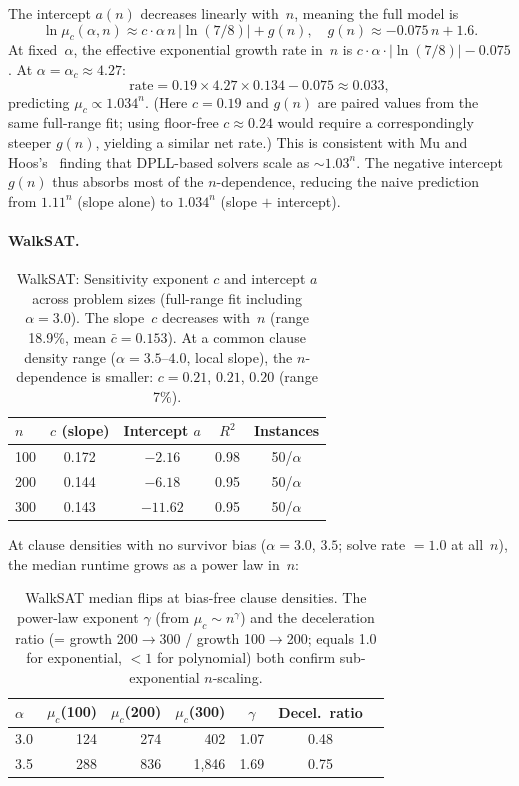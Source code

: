 \documentclass[11pt,a4paper]{article}
\newcommand{\mc}{\mu_c}
\begin{document}
The intercept $a(n)$ decreases linearly with~$n$, meaning
the full model is
\[
\ln \mc(\alpha, n) \approx c \cdot \alpha\, n\, |\!\ln(7/8)|
  + g(n), \quad g(n) \approx -0.075\, n + 1.6.
\]
At fixed~$\alpha$, the effective exponential growth rate in~$n$
is $c \cdot \alpha \cdot |\!\ln(7/8)| - 0.075$.
At $\alpha = \alpha_c \approx 4.27$:
\[
\text{rate} = 0.19 \times 4.27 \times 0.134 - 0.075
  \approx 0.033,
\]
predicting $\mc \propto 1.034^n$.
(Here $c = 0.19$ and $g(n)$ are paired values from the same
full-range fit; using floor-free $c \approx 0.24$ would require
a correspondingly steeper $g(n)$, yielding a similar net rate.)
This is consistent with Mu and Hoos's~\cite{MuHoos2015}
finding that DPLL-based solvers scale as $\sim\! 1.03^n$.
The negative intercept $g(n)$ thus absorbs most of the
$n$-dependence, reducing the naive prediction from
$1.11^n$ (slope alone) to $1.034^n$ (slope $+$ intercept).

\paragraph{WalkSAT.}

\begin{table}[h]
\centering
\begin{tabular}{lcccc}
\toprule
$n$ & $c$ (slope) & Intercept $a$ & $R^2$ & Instances \\
\midrule
100 & 0.172 & $-2.16$  & 0.98 & 50/$\alpha$ \\
200 & 0.144 & $-6.18$  & 0.95 & 50/$\alpha$ \\
300 & 0.143 & $-11.62$ & 0.95 & 50/$\alpha$ \\
\bottomrule
\end{tabular}
\caption{WalkSAT: Sensitivity exponent $c$ and intercept $a$
across problem sizes (full-range fit including $\alpha = 3.0$).
The slope~$c$ decreases with~$n$
(range 18.9\%, mean $\bar{c} = 0.153$).
At a common clause density range ($\alpha = 3.5$--$4.0$,
local slope), the $n$-dependence is smaller:
$c = 0.21$, $0.21$, $0.20$ (range 7\%).}
\label{tab:n_scaling_ws}
\end{table}

At clause densities with no survivor bias
($\alpha = 3.0$, $3.5$; solve rate $= 1.0$ at all~$n$),
the median runtime grows as a power law in~$n$:

\begin{table}[h]
\centering
\begin{tabular}{lrrrccc}
\toprule
$\alpha$ & $\mc$(100) & $\mc$(200) & $\mc$(300)
  & $\gamma$ & Decel.\ ratio \\
\midrule
3.0 & 124 & 274 & 402 & 1.07 & 0.48 \\
3.5 & 288 & 836 & 1{,}846 & 1.69 & 0.75 \\
\bottomrule
\end{tabular}
\caption{WalkSAT median flips at bias-free clause densities.
The power-law exponent $\gamma$ (from $\mc \sim n^\gamma$)
and the deceleration ratio
(= growth 200$\to$300 / growth 100$\to$200; equals 1.0 for
exponential, $< 1$ for polynomial) both confirm sub-exponential
$n$-scaling.}
\label{tab:n_scaling_ws_raw}
\end{table}
\end{document}
